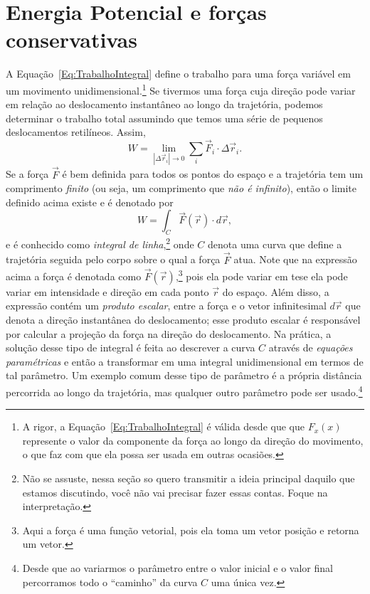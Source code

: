 
\section{Energia Potencial e forças conservativas}

A Equação~\eqref{Eq:TrabalhoIntegral} define o trabalho para uma força variável em um movimento unidimensional.\footnote{A rigor, a Equação~\eqref{Eq:TrabalhoIntegral} é válida desde que que $F_x(x)$ represente o valor da componente da força ao longo da direção do movimento, o que faz com que ela possa ser usada em outras ocasiões.} Se tivermos uma força cuja direção pode variar em relação ao deslocamento instantâneo ao longo da trajetória, podemos determinar o trabalho total assumindo que temos uma série de pequenos deslocamentos retilíneos. Assim,
\begin{equation}
    W = \lim_{|\Delta\vec{r}_i| \to 0} \sum_i \vec{F}_i\cdot\Delta\vec{r}_i.
\end{equation}
%
Se a força $\vec{F}$ é bem definida para todos os pontos do espaço e a trajetória tem um comprimento \emph{finito} (ou seja, um comprimento que \emph{não é infinito}), então o limite definido acima existe e é denotado por
\begin{equation}\label{Eq:TrabalhoGeral}
    W = \int_C \vec{F}(\vec{r})\cdot d\vec{r},
\end{equation}
%
e é conhecido como \emph{integral de linha},\footnote{Não se assuste, nessa seção so quero transmitir a ideia principal daquilo que estamos discutindo, você não vai precisar fazer essas contas. Foque na interpretação.} onde $C$ denota uma curva que define a trajetória seguida pelo corpo sobre o qual a força $\vec{F}$ atua. Note que na expressão acima a força é denotada como $\vec{F}(\vec{r})$,\footnote{Aqui a força é uma função vetorial, pois ela toma um vetor posição e retorna um vetor.} pois ela pode variar em tese ela pode variar em intensidade e direção em cada ponto $\vec{r}$ do espaço. Além disso, a expressão contém um \emph{produto escalar}, entre a força e o vetor infinitesimal $d\vec{r}$ que denota a direção instantânea do deslocamento; esse produto escalar é responsável por calcular a projeção da força na direção do deslocamento. Na prática, a solução desse tipo de integral é feita ao descrever a curva $C$ através de \emph{equações paramétricas} e então a transformar em uma integral unidimensional em termos de tal parâmetro. Um exemplo comum desse tipo de parâmetro é a própria distância percorrida ao longo da trajetória, mas qualquer outro parâmetro pode ser usado.\footnote{Desde que ao variarmos o parâmetro entre o valor inicial e o valor final percorramos todo o ``caminho'' da curva $C$ uma única vez.}%

